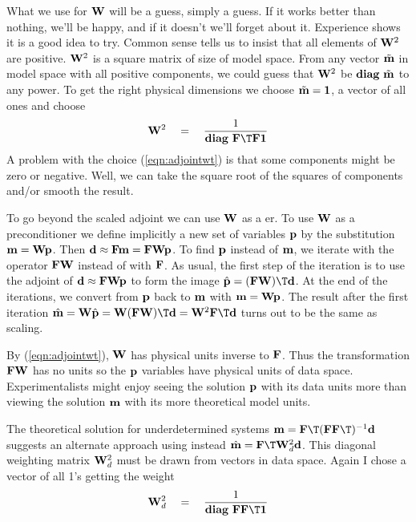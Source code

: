 \par
What we use for $\bold W$ will be a guess, simply a guess.
If it works better than nothing, we'll be happy,
and if it doesn't we'll forget about it.
Experience shows it is a good idea to try.
Common sense tells us to insist that all elements of $\bold W^2$ are positive.
$\bold W^2$ is a square matrix of size of model space.
From any vector $\tilde {\bold m}$ in model space with all positive components,
we could guess that $\bold W^2$ be
${\bf diag\ } \tilde {\bold m}$ to any power.
To get the right physical dimensions we choose
$\tilde {\bold m}=\bold 1$, a vector of all ones and choose
\begin{equation}
\bold W^2 \eq
	\frac{ 1 }{ {\bf diag\ } {\bold F\T\bold F\bold 1} }
\label{eqn:adjointwt}
\end{equation}
A problem with the choice
(\ref{eqn:adjointwt}) is that some components might be zero or negative.
Well, we can take the square root of the squares of components
and/or smooth the result.

\par
To go beyond the scaled adjoint we can use $\bold W$ as a er.
To use $\bold W$ as a preconditioner
we define implicitly a new set of variables $\bold p$
by the substitution $\bold m=\bold W\bold p$.
Then $\bold d \approx \bold F\bold m=\bold F\bold W\bold p$.
To find $\bold p$ instead of $\bold m$,
we iterate
with the operator $\bold  F\bold W$ instead of with $\bold F$.
As usual, the first step of the iteration is to use the adjoint
of $\bold d\approx \bold F\bold W\bold p$ to form the image
$\hat{\bold p}=(\bold F\bold W)\T\bold d$.
At the end of the iterations,
we convert from  $\bold p$ back to  $\bold m$
with $\bold m=\bold W\bold p$.
The result after the first iteration
$\hat{\bold m}=\bold W\hat{\bold p}=\bold W(\bold F\bold W)\T\bold d=\bold W^2\bold F\T\bold d$
turns out to be the same as scaling.
\par
By (\ref{eqn:adjointwt}), $\bold W$ has physical units inverse to $\bold F$.
Thus the transformation $\bold F\bold W$ has no units
so the $\bold p$ variables have physical units of data space.
Experimentalists might enjoy seeing the 
solution $\bold p$
with its data units more than viewing the solution $\bold m$
with its more theoretical model units.

\par
The theoretical solution for underdetermined systems
         $\bold m =\bold F\T (\bold F \bold F\T)^{-1} \bold d$
suggests
an alternate approach using instead
         $\hat{\bold m} =\bold F\T \bold W_d^2 \bold d$.
This diagonal weighting matrix $\bold W_d^2$ must be drawn
from vectors in data space.
Again I chose a vector of all 1's getting the weight
\begin{equation}
\bold W_d^2 \eq
	\frac{ 1 }{ {\bf diag\ } {\bold F\bold F\T\bold 1}
	}
\label{eqn:datawtadjoint}
\end{equation}

